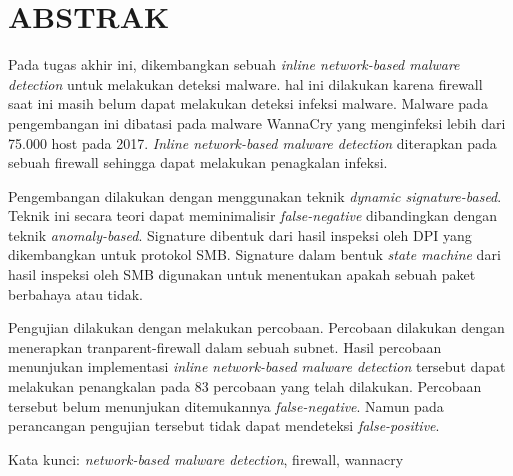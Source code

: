 \clearpage
\chapter*{ABSTRAK}

Pada tugas akhir ini, dikembangkan sebuah \textit{inline network-based malware detection} untuk melakukan deteksi malware. hal ini dilakukan karena firewall saat ini masih belum dapat melakukan deteksi infeksi malware. Malware pada pengembangan ini dibatasi pada malware WannaCry yang menginfeksi lebih dari 75.000 host pada 2017. \textit{Inline network-based malware detection} diterapkan pada sebuah firewall sehingga dapat melakukan penagkalan infeksi.

Pengembangan dilakukan dengan menggunakan teknik \textit{dynamic signature-based}. Teknik ini secara teori dapat meminimalisir \textit{false-negative} dibandingkan dengan teknik \textit{anomaly-based}. Signature dibentuk dari hasil inspeksi oleh DPI yang dikembangkan untuk protokol SMB. Signature dalam bentuk \textit{state machine} dari hasil inspeksi oleh SMB digunakan untuk menentukan apakah sebuah paket berbahaya atau tidak.

Pengujian dilakukan dengan melakukan percobaan. Percobaan dilakukan dengan menerapkan tranparent-firewall dalam sebuah subnet. Hasil percobaan menunjukan implementasi \textit{inline network-based malware detection} tersebut dapat melakukan penangkalan pada 83 percobaan yang telah dilakukan. Percobaan tersebut belum menunjukan ditemukannya \textit{false-negative}. Namun pada perancangan pengujian tersebut tidak dapat mendeteksi \textit{false-positive}.

\vspace{17px} \noindent Kata kunci: \textit{network-based malware detection}, firewall, wannacry

\clearpage